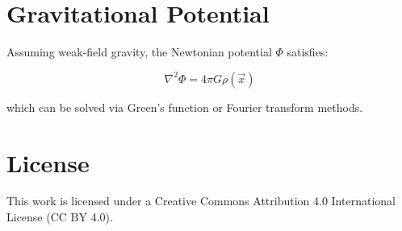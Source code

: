 \documentclass[12pt]{article}
\begin{document}
\section{Gravitational Potential}
Assuming weak-field gravity, the Newtonian potential \( \Phi \) satisfies:

\[
\nabla^2 \Phi = 4\pi G \rho(\vec{x})
\]

which can be solved via Green’s function or Fourier transform methods.


\section*{License}
This work is licensed under a Creative Commons Attribution 4.0 International License (CC BY 4.0).
\end{document}
